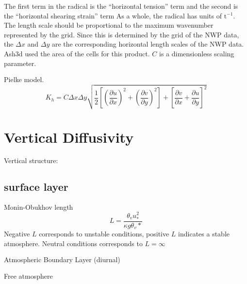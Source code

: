 The first term in the radical is the ``horizontal tension'' term and the second is
the ``horizontal shearing strain'' term %
As a whole, the radical has units of $\mathrm{t}^{-1}$.
The length scale should be proportional to the maximum wavenumber represented by the grid.
Since this is determined by the grid of the NWP data, the $\Delta x$ and $\Delta y$ are the 
corresponding horizontal length scales of the NWP data. Ash3d used the area of the cells
for this product. $C$ is a dimensionless scaling parameter.

Pielke model.
\begin{equation}
K_h = C \Delta x \Delta y \sqrt{
\frac{1}{2}\left[ \left(\frac{\partial u}{\partial x}\right)^2 + \left(\frac{\partial v}{\partial y}\right)^2 \right]
+ \left[ \frac{\partial v}{\partial x} +\frac{\partial u}{\partial y} \right]^2}
\end{equation}


\section{Vertical Diffusivity}\label{ChapAppendVarDiff_Sec_Kv}
Vertical structure:

\subsection{surface layer}
Monin-Obukhov length
\begin{equation}
L = \frac{\theta_v u^2_{*}}{\kappa g \theta_v*}
\end{equation}
Negative $L$ corresponds to unstable conditions, positive $L$ indicates a stable atmosphere. Neutral
conditions corresponds to $L=\infty$


Atmospheric Boundary Layer (diurnal)

Free atmosphere


